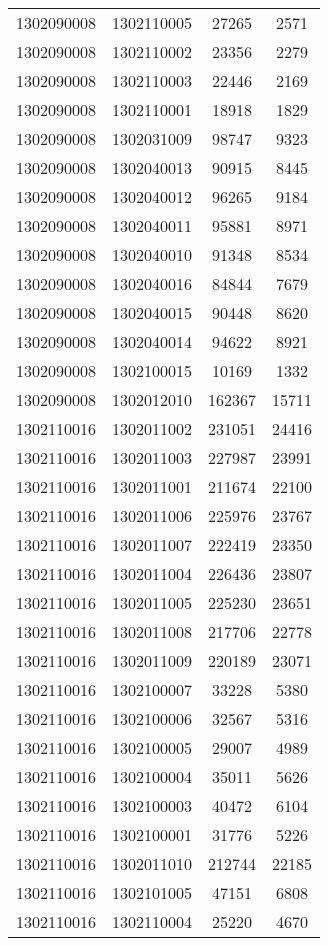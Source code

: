 \begin{longtable}{llcc}
1302090008 & 1302110005 & 27265 & 2571\\
1302090008 & 1302110002 & 23356 & 2279\\
1302090008 & 1302110003 & 22446 & 2169\\
1302090008 & 1302110001 & 18918 & 1829\\
1302090008 & 1302031009 & 98747 & 9323\\
1302090008 & 1302040013 & 90915 & 8445\\
1302090008 & 1302040012 & 96265 & 9184\\
1302090008 & 1302040011 & 95881 & 8971\\
1302090008 & 1302040010 & 91348 & 8534\\
1302090008 & 1302040016 & 84844 & 7679\\
1302090008 & 1302040015 & 90448 & 8620\\
1302090008 & 1302040014 & 94622 & 8921\\
1302090008 & 1302100015 & 10169 & 1332\\
1302090008 & 1302012010 & 162367 & 15711\\
1302110016 & 1302011002 & 231051 & 24416\\
1302110016 & 1302011003 & 227987 & 23991\\
1302110016 & 1302011001 & 211674 & 22100\\
1302110016 & 1302011006 & 225976 & 23767\\
1302110016 & 1302011007 & 222419 & 23350\\
1302110016 & 1302011004 & 226436 & 23807\\
1302110016 & 1302011005 & 225230 & 23651\\
1302110016 & 1302011008 & 217706 & 22778\\
1302110016 & 1302011009 & 220189 & 23071\\
1302110016 & 1302100007 & 33228 & 5380\\
1302110016 & 1302100006 & 32567 & 5316\\
1302110016 & 1302100005 & 29007 & 4989\\
1302110016 & 1302100004 & 35011 & 5626\\
1302110016 & 1302100003 & 40472 & 6104\\
1302110016 & 1302100001 & 31776 & 5226\\
1302110016 & 1302011010 & 212744 & 22185\\
1302110016 & 1302101005 & 47151 & 6808\\
1302110016 & 1302110004 & 25220 & 4670\\

\end{longtable}
